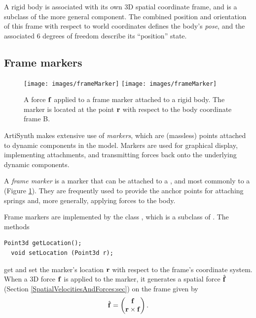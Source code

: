 A rigid body is associated with its own 3D spatial coordinate frame,
and is a subclass of the more general
 component.
The combined position and orientation of this frame with respect to
world coordinates defines the body's {\it pose}, and the associated 6
degrees of freedom describe its ``position'' state.

\subsection{Frame markers}
\label{FrameMarkers:sec}

\begin{figure}[t]
\begin{center}
 \iflatexml
   \texttt{[image: images/frameMarker]}
 \else
   \texttt{[image: images/frameMarker]}
 \fi
\end{center}
\caption{A force ${\bf f}$ applied to a frame marker attached to a rigid
body. The marker is located at the point ${\bf r}$ with respect to the body
coordinate frame B.}
\label{frameMarker:fig}
\end{figure}

ArtiSynth makes extensive use of {\it markers}, which are (massless)
points attached to dynamic components in the model. Markers are used
for graphical display, implementing attachments, and transmitting
forces back onto the underlying dynamic components.

A {\it frame marker} is a marker that can be attached to a
, and most commonly to a
 (Figure
\ref{frameMarker:fig}). They are frequently used to provide the
anchor points for attaching springs and, more generally, applying
forces to the body.

Frame markers are implemented by the class
, which
is a subclass of
.
The methods
\begin{lstlisting}[]
  Point3d getLocation();
  void setLocation (Point3d r);
\end{lstlisting}
%
get and set the marker's location ${\bf r}$ with respect to the frame's
coordinate system. When a 3D force ${\bf f}$ is applied to the marker, it
generates a spatial force $\hat{{\bf f}}$ (Section
\ref{SpatialVelocitiesAndForces:sec}) on the frame given by
%
\begin{equation}
\hat{{\bf f}} = \left(\begin{matrix} {\bf f} \\ {\bf r} \times {\bf f} \end{matrix}\right).
\end{equation}
%


